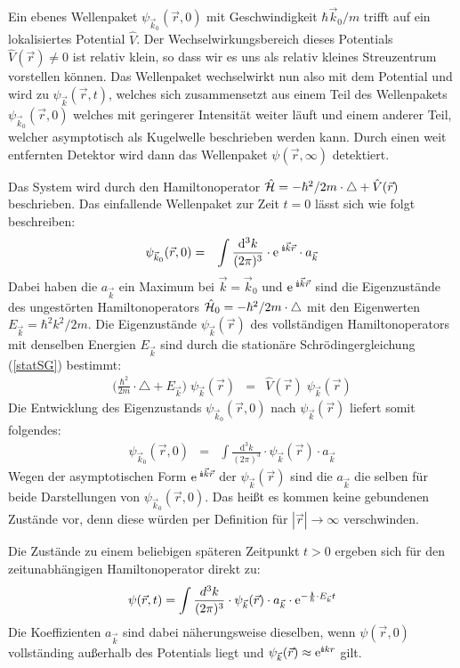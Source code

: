 Ein ebenes Wellenpaket $\psi_{\vec{k}_0}(\vec{r},0)$ mit Geschwindigkeit $\hbar\vec{k}_0/m$ trifft auf ein lokalisiertes Potential $\hat{V}$. Der Wechselwirkungsbereich dieses Potentials $\hat{V}(\vec{r})\neq0$ ist relativ klein, so dass wir es uns als relativ kleines Streuzentrum vorstellen können. Das Wellenpaket wechselwirkt nun also mit dem Potential und wird zu $\psi_{\vec{k}}(\vec{r},t)$, welches sich zusammensetzt aus einem Teil des Wellenpakets $\psi_{\vec{k}_0}(\vec{r},0)$ welches mit geringerer Intensität weiter läuft und einem anderer Teil, welcher asymptotisch als Kugelwelle beschrieben werden kann. Durch einen weit entfernten Detektor wird dann das Wellenpaket $\psi(\vec{r},\infty)$ detektiert. 

Das System wird durch den Hamiltonoperator $\hat{\mathcal H}=-\hbar^2/2m\cdot\triangle + \hat{V}(\vec{r})$ beschrieben. Das einfallende Wellenpaket zur Zeit $t=0$ lässt sich wie folgt beschreiben:
\begin{eqnarray*}
	\psi_{\vec{k}_0}(\vec{r},0) &=& \int \frac{\mathrm{d} ^3k}{(2\pi)^3}\cdot \e^{\;\I\vec{k}\vec{r}}\cdot a_{\vec{k}} 
\end{eqnarray*}
Dabei haben die $a_{\vec{k}}$ ein Maximum bei $\vec{k}=\vec{k}_0$ und  $\e^{\;\I\vec{k}\vec{r}}$ sind die Eigenzustände des ungestörten Hamiltonoperators $\hat{\mathcal H}_0=-\hbar^2/2m\cdot\triangle$ mit den Eigenwerten $E_{\vec{k}}=\hbar^2k^2/2m$. Die Eigenzustände $\psi_{\vec{k}}(\vec{r})$ des vollständigen Hamiltonoperators mit denselben Energien $E_{\vec{k}}$ sind durch die stationäre Schrödingergleichung (\ref{statSG}) bestimmt: 
\begin{eqnarray*}
	\Big(\frac{\hbar^2}{2m}\cdot\triangle + E_{\vec{k}}\Big)\;\psi_{\vec{k}}(\vec{r}) &=& \hat{V}(\vec{r})\;\psi_{\vec{k}}(\vec{r})
\end{eqnarray*}
Die Entwicklung des Eigenzustands $\psi_{\vec{k}_0}(\vec{r},0)$ nach $\psi_{\vec{k}}(\vec{r})$ liefert somit folgendes:
\begin{eqnarray*}
	\psi_{\vec{k}_0}(\vec{r},0) &=& \int \frac{\mathrm{d}^3 k}{(2 \pi)^3}\cdot \psi_{\vec{k}}(\vec{r})\cdot a_{\vec k}
\end{eqnarray*}
Wegen der asymptotischen Form $\e^{\;\I\vec{k}\vec{r}}$ der $\psi_{\vec{k}}(\vec{r})$ sind die $a_{\vec{k}}$ die selben für beide Darstellungen von $\psi_{\vec{k}_0}(\vec{r},0)$. Das heißt es kommen keine gebundenen Zustände vor, denn diese würden per Definition für $|\vec{r}| \to \infty$ verschwinden. 

Die Zustände zu einem beliebigen späteren Zeitpunkt $t>0$ ergeben sich für den zeitunabhängigen Hamiltonoperator direkt zu: 
\begin{eqnarray*}
	\psi(\vec{r},t) = \int \frac{d^3 k}{(2\pi)^3}\cdot\psi_{\vec{k}}(\vec{r})\cdot a_{\vec k} \cdot \e^{-\frac{\I}{\hbar}\cdot  E_{\vec{k}} t}
\end{eqnarray*}
Die Koeffizienten $a_{\vec{k}}$ sind dabei näherungsweise dieselben, wenn $\psi(\vec{r},0)$ vollständing außerhalb des Potentials liegt und $\psi_{\vec{k}}(\vec{r})\approx \e^{\I kr}$ gilt. 

